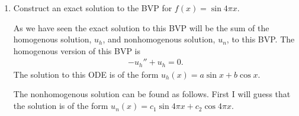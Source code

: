 \documentclass[11pt, oneside]{article}
\begin{document}
\begin{enumerate}
        This is equivalent to the following matrix equation
        \begin{align*}
            A\v{u} &= \v{f}
            \intertext{where}
            \v{u} &= \br{U_0, U_1, \cdots, U_N}^T \\
            \v{f} &= \br{f(x_0), f(x_1), \cdots, f(x_N)}^T \\
            A &= \frac{1}{12h^2}
            \begin{bmatrix}
                30+12h^2 & -16    & 1      &        & \cdots & 1      & -16 \\
                -16    & 30+12h^2 & -16    & 1      &        & \cdots & 1   \\
                1      & -16    & 30+12h^2 & -16    & 1      &        &     \\
                \vdots & \ddots & \ddots & \ddots & \ddots & \ddots & \vdots \\
                       &        & 1      & -16    & 30+12h^2 & -16    & 1   \\
                1      & \cdots &        & 1      & -16    & 30+12h^2 & -16 \\
                -16    & 1      & \cdots &        & 1      & -16     & 30+12h^2 \\
            \end{bmatrix}
        \end{align*}

    \item %
        Construct an exact solution to the BVP for $f(x) = \sin{4\pi x}$.

        As we have seen the exact solution to this BVP will be the sum of the
        homogenous solution, $u_h$, and nonhomogenous solution, $u_n$, to this BVP.
        The homogenous version of this BVP is
        \begin{align*}
            -u_h'' + u_h = 0.
        \end{align*}
        The solution to this ODE is of the form $u_h(x) = a\sin{x} + b\cos{x}$.

        The nonhomogenous solution can be found as follows.
        First I will guess that the solution is of the form
        $u_n(x) = c_1 \sin{4\pi x} + c_2\cos{4 \pi x}$.


\end{enumerate}
\end{document}
